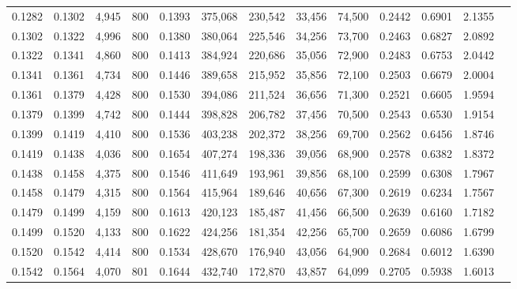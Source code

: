 \begin{tabular}{rrrrrrrrrrrrr}
0.1282 & 0.1302 &  4,945 &   800 &                                     0.1393 & 375,068 & 230,542 &  33,456 &  74,500 & 0.2442 & 0.6901 & 2.1355 \\
0.1302 & 0.1322 &  4,996 &   800 &                                     0.1380 & 380,064 & 225,546 &  34,256 &  73,700 & 0.2463 & 0.6827 & 2.0892 \\
0.1322 & 0.1341 &  4,860 &   800 &                                     0.1413 & 384,924 & 220,686 &  35,056 &  72,900 & 0.2483 & 0.6753 & 2.0442 \\
0.1341 & 0.1361 &  4,734 &   800 &                                     0.1446 & 389,658 & 215,952 &  35,856 &  72,100 & 0.2503 & 0.6679 & 2.0004 \\
0.1361 & 0.1379 &  4,428 &   800 &                                     0.1530 & 394,086 & 211,524 &  36,656 &  71,300 & 0.2521 & 0.6605 & 1.9594 \\
0.1379 & 0.1399 &  4,742 &   800 &                                     0.1444 & 398,828 & 206,782 &  37,456 &  70,500 & 0.2543 & 0.6530 & 1.9154 \\
0.1399 & 0.1419 &  4,410 &   800 &                                     0.1536 & 403,238 & 202,372 &  38,256 &  69,700 & 0.2562 & 0.6456 & 1.8746 \\
0.1419 & 0.1438 &  4,036 &   800 &                                     0.1654 & 407,274 & 198,336 &  39,056 &  68,900 & 0.2578 & 0.6382 & 1.8372 \\
0.1438 & 0.1458 &  4,375 &   800 &                                     0.1546 & 411,649 & 193,961 &  39,856 &  68,100 & 0.2599 & 0.6308 & 1.7967 \\
0.1458 & 0.1479 &  4,315 &   800 &                                     0.1564 & 415,964 & 189,646 &  40,656 &  67,300 & 0.2619 & 0.6234 & 1.7567 \\
0.1479 & 0.1499 &  4,159 &   800 &                                     0.1613 & 420,123 & 185,487 &  41,456 &  66,500 & 0.2639 & 0.6160 & 1.7182 \\
0.1499 & 0.1520 &  4,133 &   800 &                                     0.1622 & 424,256 & 181,354 &  42,256 &  65,700 & 0.2659 & 0.6086 & 1.6799 \\
0.1520 & 0.1542 &  4,414 &   800 &                                     0.1534 & 428,670 & 176,940 &  43,056 &  64,900 & 0.2684 & 0.6012 & 1.6390 \\
0.1542 & 0.1564 &  4,070 &   801 &                                     0.1644 & 432,740 & 172,870 &  43,857 &  64,099 & 0.2705 & 0.5938 & 1.6013 \\

\end{tabular}
